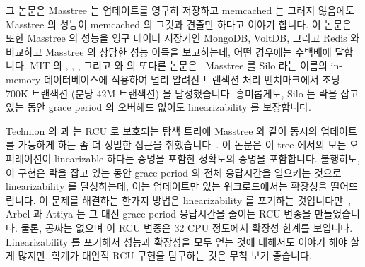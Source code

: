 그 논문은 Masstree 는 업데이트를 영구히 저장하고 memcached 는 그러지 않음에도
Masstree 의 성능이 memcached 의 그것과 견줄만 하다고 이야기 합니다.
이 논문은 또한 Masstree 의 성능을 영구 데이터 저장기인 MongoDB, VoltDB, 그리고
Redis 와 비교하고 Masstree 의 상당한 성능 이득을 보고하는데, 어떤 경우에는
수백배에 달합니다.
MIT 의 , , , 그리고
 와  의 또다른
논문은~\cite{Tu:2013:STM:2517349.2522713} Masstree 를 Silo 라는 이름의
in-memory 데이터베이스에 적용하여 널리 알려진 트랜잭션 처리 벤치마크에서 초당
700K 트랜잭션 (분당 42M 트랜잭션) 을 달성했습니다.
흥미롭게도, Silo 는 락을 잡고 있는 동안 grace period 의 오버헤드 없이도
linearizability 를 보장합니다.

\iffalse

\ppl{Yandong}{Mao} and \ppl{Robert}{Morris} of MIT and \ppl{Eddie}{Kohler} of
Harvard University created another RCU-protected tree named
Masstree~\cite{Mao:2012:CCF:2168836.2168855} that combines ideas from B+
trees and tries.
Although this tree is about 2.5x slower than an RCU-protected hash table,
it supports operations on key ranges, unlike hash tables.
In addition, Masstree supports efficient storage of objects with long
shared key prefixes and, furthermore, provides persistence via logging
to mass storage.

The paper notes that Masstree's performance rivals that of memcached, even
given that Masstree is persistently storing updates and memcached is not.
The paper also compares Masstree's performance to the persistent
datastores MongoDB, VoltDB, and Redis, reporting significant performance
advantages for Masstree, in some cases exceeding two orders of magnitude.
Another paper~\cite{Tu:2013:STM:2517349.2522713}, by \ppl{Stephen}{Tu},
\ppl{Wenting}{Zheng}, \ppl{Barbara}{Liskov}, and \ppl{Samuel}{Madden}
of MIT and \pplsur{Eddie}{Kohler},
applies Masstree to an in-memory database named Silo, achieving 700K
transactions per second (42M transactions per minute) on a well-known
transaction-processing benchmark.
Interestingly enough, Silo guarantees linearizability without incurring
the overhead of grace periods while holding locks.

\fi

Technion 의
 과  는 RCU 로 보호되는 탐색 트리에
Masstree 와 같이 동시의 업데이트를 가능하게 하는 좀 더 정밀한 접근을
취했습니다~\cite{MayaArbel2014RCUtree}.
이 논문은 이 tree 에서의 모든 오퍼레이션이 linearizable 하다는 증명을 포함한
정확도의 증명을 포함합니다.
불행히도, 이 구현은 락을 잡고 있는 동안 grace period 의 전체 응답시간을
일으키는 것으로 linearizability 를 달성하는데, 이는 업데이트만 있는
워크로드에서는 확장성을 떨어뜨립니다.
이 문제를 해결하는 한가지 방법은 linearizability 를 포기하는
것입니다만~\cite{AndreasHaas2012FIFOisnt,PaulEMcKennneyAtomicTreeN4037},
Arbel 과 Attiya 는 그 대신 grace period 응답시간을 줄이는 RCU 변종을
만들었습니다.
물론, 공짜는 없으며 이 RCU 변종은 32 CPU 정도에서 확장성 한계를 보입니다.
Linearizability 를 포기해서 성능과 확장성을 모두 얻는 것에 대해서도 이야기 해야
할 게 많지만, 학계가 대안적 RCU 구현을 탐구하는 것은 무척 보기 좋습니다.

